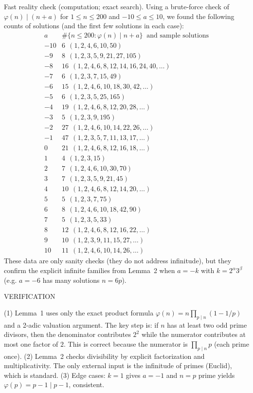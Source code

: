 Fast reality check (computation; exact search).
Using a brute-force check of $\varphi(n)\mid (n+a)$ for $1\le n\le 200$ and $-10\le a\le 10$, we found the following counts of solutions (and the first few solutions in each case):
\[
\begin{array}{r|l}
 a & \#\{n\le 200: \varphi(n)\mid n+a\}\ \text{ and sample solutions}\\\hline
 -10 & 6\ \ (1,2,4,6,10,50)\\
 -9 & 8\ \ (1,2,3,5,9,21,27,105)\\
 -8 & 16\ \ (1,2,4,6,8,12,14,16,24,40,\dots)\\
 -7 & 6\ \ (1,2,3,7,15,49)\\
 -6 & 15\ \ (1,2,4,6,10,18,30,42,\dots)\\
 -5 & 6\ \ (1,2,3,5,25,165)\\
 -4 & 19\ \ (1,2,4,6,8,12,20,28,\dots)\\
 -3 & 5\ \ (1,2,3,9,195)\\
 -2 & 27\ \ (1,2,4,6,10,14,22,26,\dots)\\
 -1 & 47\ \ (1,2,3,5,7,11,13,17,\dots)\\
 0 & 21\ \ (1,2,4,6,8,12,16,18,\dots)\\
 1 & 4\ \ (1,2,3,15)\\
 2 & 7\ \ (1,2,4,6,10,30,70)\\
 3 & 7\ \ (1,2,3,5,9,21,45)\\
 4 & 10\ \ (1,2,4,6,8,12,14,20,\dots)\\
 5 & 5\ \ (1,2,3,7,75)\\
 6 & 8\ \ (1,2,4,6,10,18,42,90)\\
 7 & 5\ \ (1,2,3,5,33)\\
 8 & 12\ \ (1,2,4,6,8,12,16,22,\dots)\\
 9 & 10\ \ (1,2,3,9,11,15,27,\dots)\\
 10 & 11\ \ (1,2,4,6,10,14,26,\dots)
\end{array}
\]
These data are only sanity checks (they do not address infinitude), but they confirm the explicit infinite families from Lemma~2 when $a=-k$ with $k=2^\alpha 3^\beta$ (e.g. $a=-6$ has many solutions $n=6p$).

VERIFICATION

(1) Lemma~1 uses only the exact product formula $\varphi(n)=n\prod_{p\mid n}(1-1/p)$ and a 2-adic valuation argument. The key step is: if $n$ has at least two odd prime divisors, then the denominator contributes $2^2$ while the numerator contributes at most one factor of $2$. This is correct because the numerator is $\prod_{p\mid n} p$ (each prime once).
(2) Lemma~2 checks divisibility by explicit factorization and multiplicativity. The only external input is the infinitude of primes (Euclid), which is standard.
(3) Edge cases: $k=1$ gives $a=-1$ and $n=p$ prime yields $\varphi(p)=p-1\mid p-1$, consistent.

